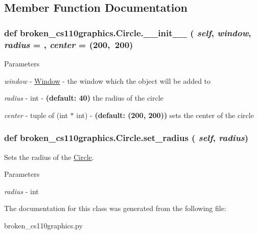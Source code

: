 \subsection{Member Function Documentation}
\hypertarget{classbroken__cs110graphics_1_1Circle_a4f51b9f8f5e8ea901532610e40024fb5}{
\subsubsection[{\_\-\_\-init\_\-\_\-}]{\setlength{\rightskip}{0pt plus 5cm}def broken\_\-cs110graphics.Circle.\_\-\_\-init\_\-\_\- ( {\em self}, \/   {\em window}, \/   {\em radius} = {}, \/   {\em center} = {\ttfamily (200,~200})}}
\label{classbroken__cs110graphics_1_1Circle_a4f51b9f8f5e8ea901532610e40024fb5}

\begin{DoxyParams}{Parameters}
\item[{\em window}]-\/ \hyperlink{classbroken__cs110graphics_1_1Window}{Window} -\/ the window which the object will be added to \item[{\em radius}]-\/ int -\/ {\bfseries (default: 40)} the radius of the circle \item[{\em center}]-\/ tuple of (int $\ast$ int) -\/ {\bfseries (default: (200, 200))} sets the center of the circle \end{DoxyParams}
\hypertarget{classbroken__cs110graphics_1_1Circle_afd1898ddb6e5e6d51992e7b63332135b}{
\subsubsection[{set\_\-radius}]{\setlength{\rightskip}{0pt plus 5cm}def broken\_\-cs110graphics.Circle.set\_\-radius ( {\em self}, \/   {\em radius})}}
\label{classbroken__cs110graphics_1_1Circle_afd1898ddb6e5e6d51992e7b63332135b}


Sets the radius of the \hyperlink{classbroken__cs110graphics_1_1Circle}{Circle}. 
\begin{DoxyParams}{Parameters}
\item[{\em radius}]-\/ int \end{DoxyParams}


The documentation for this class was generated from the following file:\begin{DoxyCompactItemize}
\item 
broken\_\-cs110graphics.py\end{DoxyCompactItemize}
